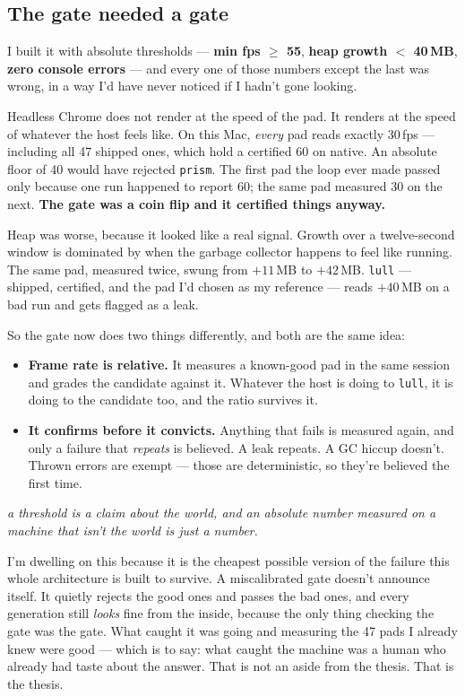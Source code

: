 \documentclass[10pt,letterpaper,twocolumn]{article}
\newcommand{\pull}[1]{%
  \par\vspace{0.4em}
  {\aclight\small\color{acpink}\itshape #1}\par
  \vspace{0.4em}}
\begin{document}
\subsection{The gate needed a gate}

I built it with absolute thresholds --- \textbf{min fps $\geq$ 55}, \textbf{heap growth $<$ 40\,MB}, \textbf{zero console errors} --- and every one of those numbers except the last was wrong, in a way I'd have never noticed if I hadn't gone looking.

Headless Chrome does not render at the speed of the pad. It renders at the speed of whatever the host feels like. On this Mac, \emph{every} pad reads exactly 30\,fps --- including all 47 shipped ones, which hold a certified 60 on native. An absolute floor of 40 would have rejected \texttt{prism}. The first pad the loop ever made passed only because one run happened to report 60; the same pad measured 30 on the next. \textbf{The gate was a coin flip and it certified things anyway.}

Heap was worse, because it looked like a real signal. Growth over a twelve-second window is dominated by when the garbage collector happens to feel like running. The same pad, measured twice, swung from $+11$\,MB to $+42$\,MB. \texttt{lull} --- shipped, certified, and the pad I'd chosen as my reference --- reads $+40$\,MB on a bad run and gets flagged as a leak.

So the gate now does two things differently, and both are the same idea:

\begin{itemize}
  \item \textbf{Frame rate is relative.} It measures a known-good pad in the same session and grades the candidate against it. Whatever the host is doing to \texttt{lull}, it is doing to the candidate too, and the ratio survives it.
  \item \textbf{It confirms before it convicts.} Anything that fails is measured again, and only a failure that \emph{repeats} is believed. A leak repeats. A GC hiccup doesn't. Thrown errors are exempt --- those are deterministic, so they're believed the first time.
\end{itemize}

\pull{a threshold is a claim about the world, and an absolute number measured on a machine that isn't the world is just a number.}

I'm dwelling on this because it is the cheapest possible version of the failure this whole architecture is built to survive. A miscalibrated gate doesn't announce itself. It quietly rejects the good ones and passes the bad ones, and every generation still \emph{looks} fine from the inside, because the only thing checking the gate was the gate. What caught it was going and measuring the 47 pads I already knew were good --- which is to say: what caught the machine was a human who already had taste about the answer. That is not an aside from the thesis. That is the thesis.
\end{document}
